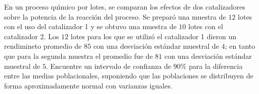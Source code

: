 \begin{enunciado}
 En un proceso qu\'{\i}mico por lotes, se comparan los efectos de dos catalizadores sobre la potencia de la reacci\'on del proceso. Se prepar\'o una muestra de $12$ lotes con el uso del catalizador 1 y se obtuvo una muestra de $10$ lotes con el catalizador 2. Los $12$ lotes para los que se utiliz\'o el catalizador 1 dieron un rendimineto promedio de $85$ con una desviaci\'on est\'andar muestral de $4$; en tanto que para la segunda muestra el promedio fue de $81$ con una desviaci\'on est\'andar muestral de $5$. Encuentre un intervalo de confianza de $90\%$ para la diferencia entre las medias poblacionales, suponiendo que las poblaciones se distribuyen de forma aproximadamente normal con varianzas iguales.
\end{enunciado}

